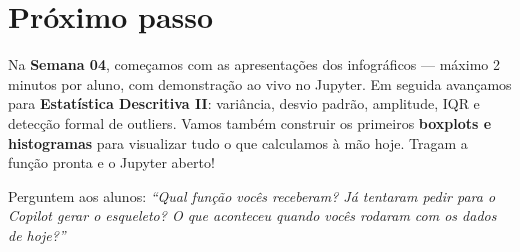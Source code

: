 \section{Próximo passo}

Na \textbf{Semana 04}, começamos com as apresentações dos infográficos —
máximo 2 minutos por aluno, com demonstração ao vivo no Jupyter. Em seguida
avançamos para \textbf{Estatística Descritiva II}: variância, desvio padrão,
amplitude, IQR e detecção formal de outliers. Vamos também construir os
primeiros \textbf{boxplots e histogramas} para visualizar tudo o que calculamos
à mão hoje. Tragam a função pronta e o Jupyter aberto!

Perguntem aos alunos: \textit{``Qual função vocês receberam? Já tentaram pedir
para o Copilot gerar o esqueleto? O que aconteceu quando vocês rodaram com os
dados de hoje?''}

